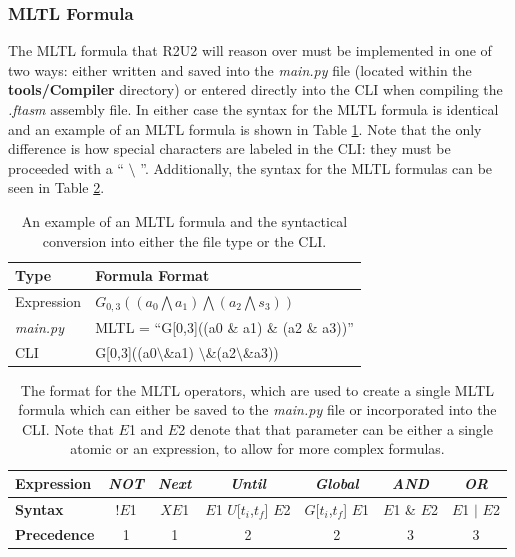 \subsubsection{MLTL Formula}
\label{HWmltlFormula}
The MLTL formula that R2U2 will reason over must be implemented in one of two ways: either written and saved into the \textit{main.py} file (located within the \textbf{tools/Compiler} directory) or entered directly into the CLI when compiling the \textit{.ftasm} assembly file. In either case the syntax for the MLTL formula is identical and an example of an MLTL formula is shown in Table \ref{HWmltlFormulaTable}. Note that the only difference is how special characters are labeled in the CLI: they must be proceeded with a `` $\setminus$ ''. Additionally, the syntax for the MLTL formulas can be seen in Table \ref{HWsyntaxMLTL}.

\begin{table}[H]
	\caption{An example of an MLTL formula and the syntactical conversion into either the file type or the CLI.}
	\label{HWmltlFormulaTable}
	\begin{center}
	\begin{tabular}{l | l}
		\hline
		\hline
		\textbf{Type} & \textbf{Formula Format}\\
		\hline
		Expression & $G_{0,3}((a_0\bigwedge a_1)\bigwedge (a_2 \bigwedge s_3))$\\
		\textit{main.py} & MLTL = ``G[0,3]((a0 \& a1) \& (a2 \& a3))''\\
		CLI & G[0,3]((a0$\setminus$\&a1) $\setminus$\&(a2$\setminus$\&a3))\\
		\hline
		\hline
	\end{tabular}
	\end{center}
\end{table}

\begin{table}[H]
	\caption{The format for the MLTL operators, which are used to create a single MLTL formula which can either be saved to the \textit{main.py} file or incorporated into the CLI. Note that $E$1 and $E$2 denote that that parameter can be either a single atomic or an expression, to allow for more complex formulas.}
	\label{HWsyntaxMLTL}

	\begin{center}
	\begin{tabular}{l | c | c | c | c | c | c}
		\hline
		\hline
		\textbf{Expression} & \textit{NOT} & \textit{Next} & \textit{Until} & \textit{Global} & \textit{AND} & \textit{OR}\\
		\hline
		\textbf{Syntax} & !$E$1 & $XE$1 & $E$1 $U$[$t_i$,$t_f$] $E$2 & $G$[$t_i$,$t_f$] $E$1 & $E$1 \& $E$2& $E$1 $|$ $E$2\\
		\hline
		\textbf{Precedence} & 1 & 1 & 2 & 2 & 3 & 3\\
		\hline
		\hline
	\end{tabular}
	\end{center}
\end{table}

